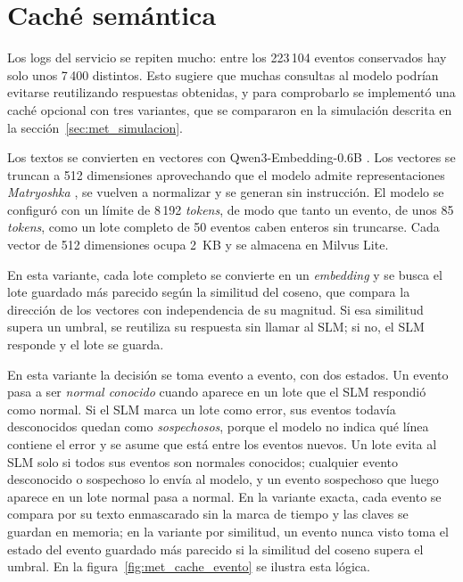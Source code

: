 \section{Caché semántica}\label{sec:met_cache}

Los logs del servicio se repiten mucho: entre los 223\,104 eventos conservados hay solo unos 7\,400 distintos. Esto sugiere que muchas consultas al modelo podrían evitarse reutilizando respuestas obtenidas, y para comprobarlo se implementó una caché opcional con tres variantes, que se compararon en la simulación descrita en la sección~\ref{sec:met_simulacion}.


Los textos se convierten en vectores con Qwen3-Embedding-0.6B \cite{zhang2025_qwen3emb}. Los vectores se truncan a 512 dimensiones aprovechando que el modelo admite representaciones \textit{Matryoshka} \cite{kusupati2022_matryoshka}, se vuelven a normalizar y se generan sin instrucción. El modelo se configuró con un límite de 8\,192 \textit{tokens}, de modo que tanto un evento, de unos 85 \textit{tokens}, como un lote completo de 50 eventos caben enteros sin truncarse. Cada vector de 512 dimensiones ocupa 2~KB y se almacena en Milvus Lite.


En esta variante, cada lote completo se convierte en un \textit{embedding} y se busca el lote guardado más parecido según la similitud del coseno, que compara la dirección de los vectores con independencia de su magnitud. Si esa similitud supera un umbral, se reutiliza su respuesta sin llamar al SLM; si no, el SLM responde y el lote se guarda.


En esta variante la decisión se toma evento a evento, con dos estados. Un evento pasa a ser \emph{normal conocido} cuando aparece en un lote que el SLM respondió como normal. Si el SLM marca un lote como error, sus eventos todavía desconocidos quedan como \emph{sospechosos}, porque el modelo no indica qué línea contiene el error y se asume que está entre los eventos nuevos. Un lote evita al SLM solo si todos sus eventos son normales conocidos; cualquier evento desconocido o sospechoso lo envía al modelo, y un evento sospechoso que luego aparece en un lote normal pasa a normal. En la variante exacta, cada evento se compara por su texto enmascarado sin la marca de tiempo y las claves se guardan en memoria; en la variante por similitud, un evento nunca visto toma el estado del evento guardado más parecido si la similitud del coseno supera el umbral. En la figura~\ref{fig:met_cache_evento} se ilustra esta lógica.

